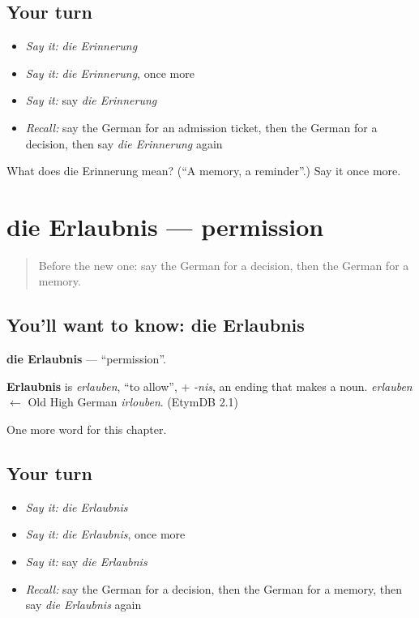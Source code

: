 \subsection*{Your turn}
\begin{itemize}
\raggedright
  \item \emph{Say it:} \emph{die Erinnerung}
  \item \emph{Say it:} \emph{die Erinnerung}, once more
  \item \emph{Say it:} say \emph{die Erinnerung}
  \item \emph{Recall:} say the German for an admission ticket, then the German for a decision, then say \emph{die Erinnerung} again
\end{itemize}

\begin{tcolorbox}[breakable,colback=teal!4,colframe=teal!35!black,title={Before you move on}]
What does die Erinnerung mean? (\textquotedblleft{}A memory, a reminder\textquotedblright{}.) Say it once more.
\end{tcolorbox}
\section[die Erlaubnis]{die Erlaubnis — permission}

\label{lesson:GE-C228-erlaubnis}



\begin{quote}
Before the new one: say the German for a decision, then the German for a memory.
\end{quote}

\subsection*{You'll want to know: die Erlaubnis}
\textbf{die Erlaubnis} — \textquotedblleft{}permission\textquotedblright{}.

\begin{cousinweb}
\textbf{Erlaubnis} is \emph{erlauben}, \textquotedblleft{}to allow\textquotedblright{}, + \emph{-nis}, an ending that makes a noun. \emph{erlauben} $\leftarrow$ Old High German \emph{irlouben}. (EtymDB 2.1)
\end{cousinweb}

\begin{grammarlens}[title={What you've built}]
One more word for this chapter.
\end{grammarlens}

\subsection*{Your turn}
\begin{itemize}
\raggedright
  \item \emph{Say it:} \emph{die Erlaubnis}
  \item \emph{Say it:} \emph{die Erlaubnis}, once more
  \item \emph{Say it:} say \emph{die Erlaubnis}
  \item \emph{Recall:} say the German for a decision, then the German for a memory, then say \emph{die Erlaubnis} again
\end{itemize}


